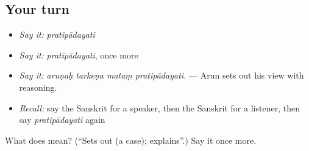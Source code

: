 \subsection*{Your turn}
\begin{itemize}
\raggedright
  \item \emph{Say it:} \emph{pratipādayati}
  \item \emph{Say it:} \emph{pratipādayati}, once more
  \item \emph{Say it:} \emph{aruṇaḥ tarkeṇa mataṃ pratipādayati.} — Arun sets out his view with reasoning.
  \item \emph{Recall:} say the Sanskrit for a speaker, then the Sanskrit for a listener, then say \emph{pratipādayati} again
\end{itemize}

\begin{tcolorbox}[breakable,colback=teal!4,colframe=teal!35!black,title={Before you move on}]
What does  mean? (\textquotedblleft{}Sets out (a case); explains\textquotedblright{}.) Say it once more.
\end{tcolorbox}
